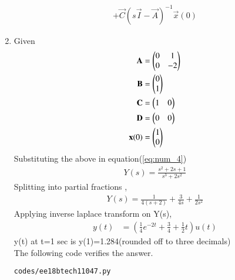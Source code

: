 \begin{enumerate}[label=\thesubsection.\arabic*.,ref=\thesubsection.\theenumi]
\begin{multline}
\\
+ \vec{C}(s\vec{I}-\vec{A})^{-1}\vec{x}(0) \label{eq:num_4}
\end{multline}
\item Given
\begin{align}
\mathbf{A}&=\begin{pmatrix}0&1\\0&-2\end{pmatrix}\\
\mathbf{B}&=\begin{pmatrix}0\\1\end{pmatrix}\\
\mathbf{C}&=\begin{pmatrix}1&0\end{pmatrix}\\
\mathbf{D}&=\begin{pmatrix}0&0\end{pmatrix}\\
\mathbf{x}(0)&=\begin{pmatrix}1\\0\end{pmatrix}
\end{align}
Substituting the above in equation(\ref{eq:num_4})
\begin{align}
{Y}(s)=\frac{s^{2}+2s+1}{s^{3}+2s^{2}}
\end{align}
Splitting into partial fractions ,
\begin{align}
{Y}(s)=\frac{1}{4(s+2)}+\frac{3}{4s}+\frac{1}{2s^{2}}
\end{align}
Applying inverse laplace transform on Y(s),
\begin{align}
y(t)&=(\frac{1}{4}e^{-2t}+\frac{3}{4}+\frac{1}{2}t)u(t)
\end{align}
y(t) at t=1 sec is
y(1)=1.284(rounded off to three decimals)\\
The following code verifies the answer.
\begin{lstlisting}
codes/ee18btech11047.py
\end{lstlisting}
\end{enumerate}
